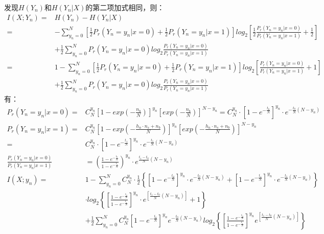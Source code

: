 \documentclass[12pt]{article}
\begin{document}
发现$H(Y_n)$和$H(Y_n|X)$的第二项加式相同，则：
\begin{equation*}
    \begin{aligned}
       I(X;Y_n)=&H(Y_n)-H(Y_n|X) \\
       =&-\sum\limits_{y_n=0}^N\left[\frac{1}{2}P_r(Y_n=y_n|x=0)+\frac{1}{2}P_r(Y_n=y_n|x=1)\right]log_2\left[\frac{1}{2}\frac{P_r(Y_n=y_n|x=0)}{P_r(Y_n=y_n|x=1)}+\frac{1}{2}\right] \\
       &+\frac{1}{2}\sum\limits_{y_n=0}^NP_r(Y_n=y_n|x=0)log_2\frac{P_r(Y_n=y_n|x=0)}{P_r(Y_n=y_n|x=1)} \\
       =&1-\sum\limits_{y_n=0}^N\left[\frac{1}{2}P_r(Y_n=y_n|x=0)+\frac{1}{2}P_r(Y_n=y_n|x=1)\right]log_2\left[\frac{P_r(Y_n=y_n|x=0)}{P_r(Y_n=y_n|x=1)}+1\right] \\
       &+ \frac{1}{2}\sum\limits_{y_n=0}^NP_r(Y_n=y_n|x=0)log_2\frac{P_r(Y_n=y_n|x=0)}{P_r(Y_n=y_n|x=1)}
    \end{aligned}
\end{equation*}
有：
\begin{equation*}
    \begin{aligned}
       P_r(Y_n=y_n|x=0)=&C_N^{y_n}\left[1-exp\left(-\frac{n_b}{N}\right)\right]^{y_n}\left[exp\left(-\frac{n_b}{N}\right)\right]^{N-y_n}=C_N^{y_n}·\left[1-e^{-\frac{t_0}{N}}\right]^{y_n}·e^{-\frac{t_0}{N}(N-y_n)} \\
       P_r(Y_n=y_n|x=1)=&C_N^{y_n}\left[1-exp\left(-\frac{h_n·n_s+n_b}{N}\right)\right]^{y_n}\left[exp\left(-\frac{h_n·n_s+n_b}{N}\right)\right]^{N-y_n} \\
       =&C_N^{y_n}·\left[1-e^{-\frac{t_1}{N}}\right]^{y_n}·e^{-\frac{t_1}{N}(N-y_n)} \\
       \frac{P_r(Y_n=y_n|x=0)}{P_r(Y_n=y_n|x=1)}&=\left(\frac{1-e^{-\frac{t_0}{N}}}{1-e^{-\frac{t_1}{N}}}\right)^{y_n}·e^{\frac{t_1-t_0}{N}(N-y_n)} \\
       I(X;y_n)=&1-\sum\limits_{y_n=0}^NC_N^{y_n}·\frac{1}{2}\left\{\left[1-e^{-\frac{t_0}{N}}\right]^{y_n}·e^{-\frac{t_0}{N}(N-y_n)}+\left[1-e^{-\frac{t_1}{N}}\right]^{y_n}·e^{-\frac{t_1}{N}(N-y_n)}\right\} \\
       &·log_2\left\{\left[\frac{1-e^{-\frac{t_0}{N}}}{1-e^{-\frac{t_1}{N}}}\right]^{y_n}·e^{[\frac{t_1-t_0}{N}(N-y_n)]}+1\right\} \\
       &+\frac{1}{2}\sum\limits_{y_n=0}^NC_N^{y_n}\left[1-e^{-\frac{t_0}{N}}\right]^{y_n}e^{-\frac{t_0}{N}(N-y_n)}log_2\left\{\left[\frac{1-e^{-\frac{t_0}{N}}}{1-e^{-\frac{t_1}{N}}}\right]^{y_n}e^{[\frac{t_1-t_0}{N}(N-y_n)]}\right\}
    \end{aligned}
\end{equation*}
\end{document}
